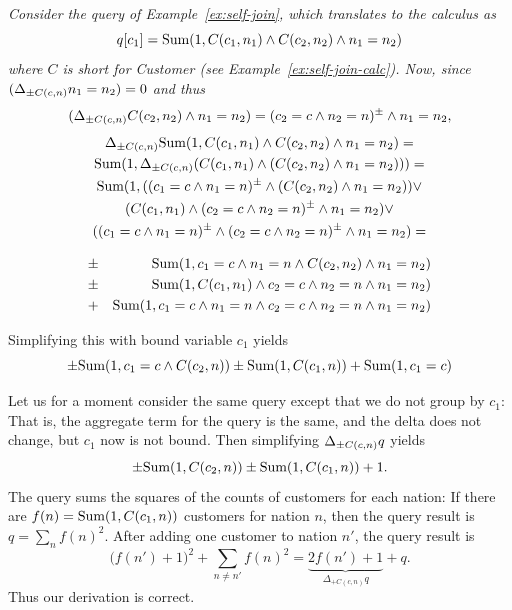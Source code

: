 \begin{example}\em
\label{ex:self-join-delta}
Consider the query of Example~\ref{ex:self-join}, which translates to the
calculus as
\[
q[c_1] = \mbox{Sum}(1, C(c_1,n_1) \land C(c_2, n_2) \land n_1=n_2)
\]
where $C$ is short for Customer (see Example~\ref{ex:self-join-calc}).
Now, since $(\Delta_{\pm C(c,n)} n_1=n_2) = 0$ and thus
\[
(\Delta_{\pm C(c,n)} C(c_2, n_2) \land n_1=n_2) = (c_2=c \land n_2=n)^\pm \land n_1=n_2,
\]
\begin{multline*}
\Delta_{\pm C(c,n)} \mbox{Sum}(1, C(c_1,n_1) \land C(c_2, n_2) \land n_1=n_2) = \\
\mbox{Sum}(1, \Delta_{\pm C(c,n)} (C(c_1,n_1) \land (C(c_2, n_2) \land n_1=n_2))) = \\
\mbox{Sum}(1, 
((c_1=c \land n_1=n)^\pm \land (C(c_2, n_2) \land n_1=n_2)) \lor \\
(C(c_1,n_1) \land (c_2=c \land n_2=n)^\pm \land n_1=n_2) \lor \\
((c_1=c \land n_1=n)^\pm \land (c_2=c \land n_2=n)^\pm \land n_1=n_2) =
\end{multline*}

\vspace{-6mm}

\begin{eqnarray*}
&\pm& \mbox{Sum}(1, c_1=c \land n_1=n \land C(c_2, n_2)       \land n_1=n_2) \\
&\pm& \mbox{Sum}(1, C(c_1,n_1)        \land c_2=c \land n_2=n \land n_1=n_2) \\
&+&   \mbox{Sum}(1, c_1=c \land n_1=n \land c_2=c \land n_2=n \land n_1=n_2)
\end{eqnarray*}

Simplifying this with bound variable $c_1$ yields
\[
\pm \mbox{Sum}(1, c_1=c \land C(c_2, n))
\pm \mbox{Sum}(1, C(c_1,n))
+   \mbox{Sum}(1, c_1=c)
\]

Let us for a moment consider the same query except that we do not group by
$c_1$: That is, the aggregate term for the query is the same, and the delta does not change, but $c_1$ now is not bound. Then simplifying $\Delta_{\pm C(c,n)} q$ yields
\[
\pm \mbox{Sum}(1, C(c_2, n)) \pm \mbox{Sum}(1, C(c_1,n)) + 1.
\]
The query sums the squares of the counts of customers for each nation:
If there are $f(n) = \mbox{Sum}(1, C(c_1,n))$
customers for nation $n$, then the query result is
$q = \sum_n f(n)^2$. After adding one customer to nation $n'$, the query result
is
\[
\big( f(n')+1 \big)^2 + \sum_{n \neq n'} f(n)^2 =
\underbrace{2 f(n') + 1}_{\Delta_{+C(c,n)} q} + q.
\]
Thus our derivation is correct.
\punto
\end{example}



